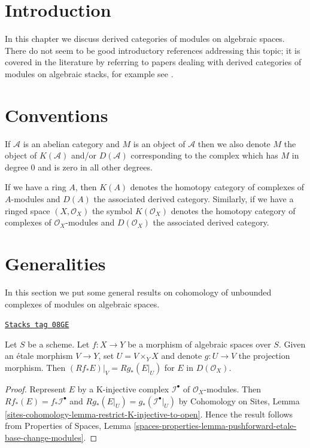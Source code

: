 \section{Introduction}
\label{spaces-perfect-section-introduction}
In this chapter we discuss derived categories of modules on algebraic spaces.
There do not seem to be good introductory references addressing this topic;
it is covered in the literature by referring to papers dealing with derived
categories of modules on algebraic stacks, for example see
\cite{olsson_sheaves}.

\section{Conventions}
\label{spaces-perfect-section-conventions}
If $\mathcal{A}$ is an abelian category and $M$ is an object
of $\mathcal{A}$ then we also denote $M$ the object of $K(\mathcal{A})$
and/or $D(\mathcal{A})$ corresponding to the complex which has
$M$ in degree $0$ and is zero in all other degrees.

\medskip\noindent
If we have a ring $A$, then $K(A)$ denotes the homotopy category
of complexes of $A$-modules and $D(A)$ the associated derived category.
Similarly, if we have a ringed space $(X, \mathcal{O}_X)$ the symbol
$K(\mathcal{O}_X)$ denotes the homotopy category of complexes of
$\mathcal{O}_X$-modules and $D(\mathcal{O}_X)$ the associated derived
category.

\section{Generalities}
\label{spaces-perfect-section-generalities}
In this section we put some general results on cohomology of unbounded
complexes of modules on algebraic spaces.

\begin{lemma}
\label{spaces-perfect-lemma-restrict-direct-image-open}
\href{https://stacks.math.columbia.edu/tag/08GE}{\texttt{Stacks tag 08GE}}

Let $S$ be a scheme. Let $f : X \to Y$ be a morphism of algebraic spaces
over $S$. Given an \'etale morphism $V \to Y$, set $U = V \times_Y X$
and denote $g : U \to V$ the projection morphism. Then
$(Rf_*E)|_V = Rg_*(E|_U)$ for $E$ in $D(\mathcal{O}_X)$.
\end{lemma}

\begin{proof}
Represent $E$ by a K-injective complex $\mathcal{I}^\bullet$ of
$\mathcal{O}_X$-modules. Then $Rf_*(E) = f_*\mathcal{I}^\bullet$
and $Rg_*(E|_U) = g_*(\mathcal{I}^\bullet|_U)$ by
Cohomology on Sites, Lemma
\ref{sites-cohomology-lemma-restrict-K-injective-to-open}.
Hence the result follows from
Properties of Spaces,
Lemma \ref{spaces-properties-lemma-pushforward-etale-base-change-modules}.
\end{proof}

